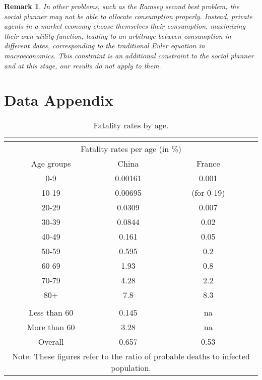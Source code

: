 \documentclass{amsart}
\newtheorem{rem}[teo]{Remark}
\begin{document}
\begin{rem} In other problems, such as the Ramsey second best problem, the social planner may not be able to allocate consumption properly. Instead, private agents in a market economy choose themselves their consumption, maximizing their own utility function, leading to an arbitrage between consumption in different dates, corresponding to the traditional Euler equation in macroeconomics. This constraint is an additional constraint to the social planner and at this stage, our results do not apply to them. 
\end{rem}

\color{black}
\newpage

\section*{Data Appendix}



\vspace{0.4cm}
\begin{table}[htbp]
  \centering

\caption{Fatality rates by age.}
\begin{tabular}{ccccc}
\hline 
\multicolumn{3}{c}{} &  & \tabularnewline
\hline 
\hline 
\multicolumn{5}{c}{{\footnotesize{}Fatality rates per age (in \%)}}\tabularnewline
{\footnotesize{}Age groups} & {\footnotesize{}China   \cite{verity2020estimates}} &  & {\footnotesize{}France \cite{salje2020estimating}} & \tabularnewline
\hline 
{\footnotesize{}0-9} & {\footnotesize{}0.00161} &  & {\footnotesize{}0.001 } & \tabularnewline
{\footnotesize{}10-19} & {\footnotesize{}0.00695} &  & {\scriptsize{}(for 0-19)} & \tabularnewline
{\footnotesize{}20-29} & {\footnotesize{}0.0309} &  & {\footnotesize{}0.007} & \tabularnewline
{\footnotesize{}30-39} & {\footnotesize{}0.0844} &  & {\footnotesize{}0.02} & \tabularnewline
{\footnotesize{}40-49} & {\footnotesize{}0.161} &  & {\footnotesize{}0.05} & \tabularnewline
{\footnotesize{}50-59} & {\footnotesize{}0.595} &  & {\footnotesize{}0.2} & \tabularnewline
{\footnotesize{}60-69} & {\footnotesize{}1.93} &  & {\footnotesize{}0.8} & \tabularnewline
{\footnotesize{}70-79} & {\footnotesize{}4.28} &  & {\footnotesize{}2.2} & \tabularnewline
{\footnotesize{}80+} & {\footnotesize{}7.8} &  & {\footnotesize{}8.3} & \tabularnewline
 &  &  &  & \tabularnewline
{\footnotesize{}Less than 60} & {\footnotesize{}0.145} &  & {\footnotesize{}na} & \tabularnewline
{\footnotesize{}More than 60} & {\footnotesize{}3.28} &  & {\footnotesize{}na} & \tabularnewline
{\footnotesize{}Overall} & {\footnotesize{}0.657} &  & {\footnotesize{}0.53} & \tabularnewline
\hline 
\multicolumn{5}{c}{{\tiny{}Note: These figures refer to the ratio of probable deaths to infected population.}}\tabularnewline
\end{tabular}
  \label{tab:Fatality_Rates_Age}%
  
\end{table}

\vspace{0.4cm}
\end{document}
